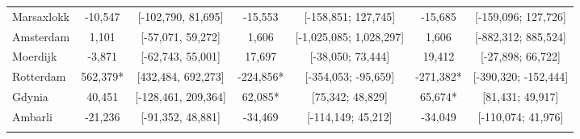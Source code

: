\begin{table}[ht]
\begin{adjustbox}{max width=\textwidth}
\begin{tabular}{lcccccc}
  Marsaxlokk & -10,547 & [-102,790, 81,695] &  -15,553 & [-158,851; 127,745] &  -15,685 & [-159,096; 127,726] \\ 
  Amsterdam &   1,101 & [-57,071, 59,272] &    1,606 & [-1,025,085; 1,028,297] &    1,606 & [-882,312; 885,524] \\ 
  Moerdijk &  -3,871 & [-62,743, 55,001] &   17,697 & [-38,050; 73,444] &   19,412 & [-27,898; 66,722] \\ 
  Rotterdam & 562,379* & [432,484, 692,273] & -224,856* & [-354,053; -95,659] & -271,382* & [-390,320; -152,444] \\ 
  Gdynia &  40,451 & [-128,461, 209,364] &   62,085* & [75,342; 48,829] &   65,674* & [81,431; 49,917] \\ 
  Ambarli & -21,236 & [-91,352, 48,881] &  -34,469 & [-114,149; 45,212] &  -34,049 & [-110,074; 41,976] \\ 
   [2ex] \hline \hline {}\end{tabular} 
 \end{adjustbox}
\endgroup
\end{table}
